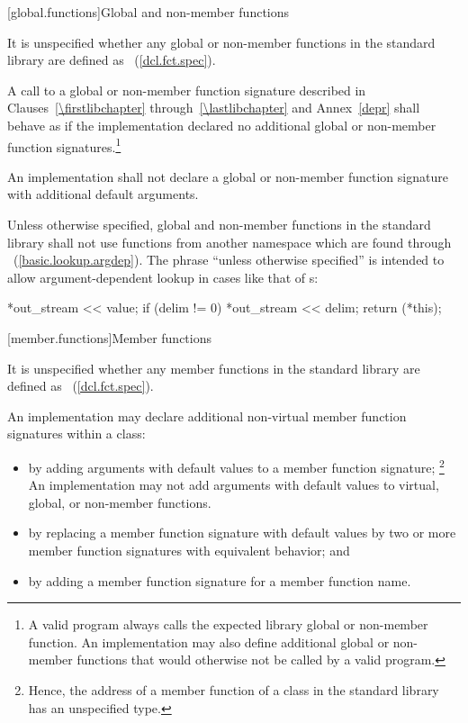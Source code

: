 [global.functions]{Global and non-member functions}

\pnum
It is unspecified whether any global
or non-member
functions in the \Cpp standard library are defined as
~(\ref{dcl.fct.spec}).

\pnum
{}A call to a global or non-member function signature
described in Clauses~\ref{\firstlibchapter} through~\ref{\lastlibchapter} and
Annex~\ref{depr} shall behave as if the implementation declared no additional
global or non-member function signatures.\footnote{A valid \Cpp program always
calls the expected library global or non-member function. An implementation may
also define additional global or non-member functions that would otherwise not
be called by a valid \Cpp program.}

\pnum
An implementation shall not declare a global or non-member function signature
with additional default arguments.

\pnum
Unless otherwise specified, global and non-member functions in the standard
library shall not use functions from another namespace which are found through
~(\ref{basic.lookup.argdep}).
\enternote
The phrase ``unless otherwise specified'' is intended to allow
argument-dependent lookup
in cases like that of
s:
\effects
\begin{codeblock}
*out_stream << value;
if (delim != 0)
  *out_stream << delim;
return (*this);
\end{codeblock}
\exitnote

[member.functions]{Member functions}

\pnum
It is unspecified whether any member functions in the \Cpp standard library are defined as
~(\ref{dcl.fct.spec}).

\pnum
An implementation may declare additional
non-virtual member function signatures within a
%
class:

\begin{itemize}
\item
by adding arguments with default values to a member function signature;%
%
\footnote{Hence, the address of a member function of a class in the \Cpp standard
library has an unspecified type.}
\enternote An implementation may not add arguments with default values to virtual,
global, or non-member functions.\exitnote
\item
by replacing a member function signature with default values by two
or more member function signatures with equivalent behavior; and
\item
by adding a member function signature for a member function name.
\end{itemize}

